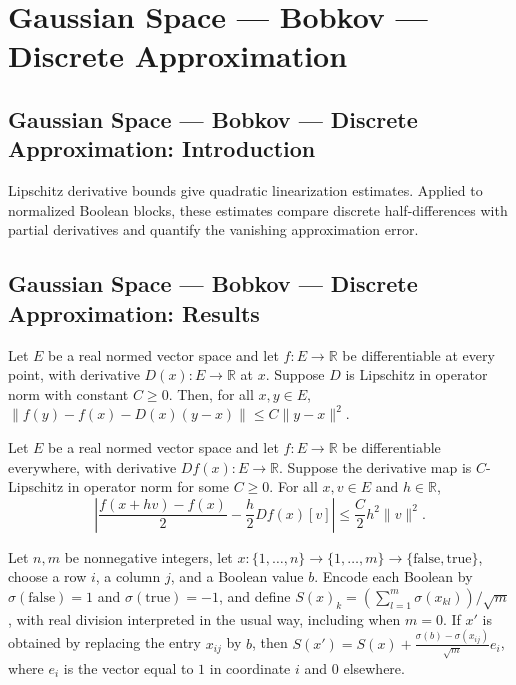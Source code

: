 \section{Gaussian Space --- Bobkov --- Discrete Approximation}
\subsection*{Gaussian Space --- Bobkov --- Discrete Approximation: Introduction}
Lipschitz derivative bounds give quadratic linearization estimates. Applied to normalized Boolean blocks, these estimates compare discrete half-differences with partial derivatives and quantify the vanishing approximation error.

\subsection*{Gaussian Space --- Bobkov --- Discrete Approximation: Results}

\begin{lemma}
\leanok
{}
Let $E$ be a real normed vector space and let $f\colon E\to\mathbb R$ be differentiable
at every point, with derivative $D(x)\colon E\to\mathbb R$ at $x$. Suppose $D$ is
Lipschitz in operator norm with constant $C\geq0$. Then, for all $x,y\in E$,
$\|f(y)-f(x)-D(x)(y-x)\|\leq C\|y-x\|^2$.
\end{lemma}

\begin{lemma}
\leanok
{}
Let $E$ be a real normed vector space and let $f:E\to\mathbb R$ be differentiable
everywhere, with derivative $Df(x):E\to\mathbb R$. Suppose the derivative map is
$C$-Lipschitz in operator norm for some $C\ge0$. For all $x,v\in E$ and $h\in\mathbb R$,
\[\left|\frac{f(x+hv)-f(x)}{2}-\frac{h}{2}Df(x)[v]\right|\le \frac{C}{2}h^2\|v\|^2.\]
\end{lemma}

\begin{lemma}
\leanok
{}
Let $n,m$ be nonnegative integers, let
$x\colon\{1,\ldots,n\}\to\{1,\ldots,m\}\to\{\mathrm{false},\mathrm{true}\}$, choose a
row $i$, a column $j$, and a Boolean value $b$. Encode each Boolean by
$\sigma(\mathrm{false})=1$ and $\sigma(\mathrm{true})=-1$, and define
$S(x)_k=(\sum_{l=1}^m\sigma(x_{kl}))/\sqrt m$, with real division interpreted in the
usual way, including when $m=0$. If $x'$ is obtained by replacing the entry $x_{ij}$ by
$b$, then $S(x')=S(x)+\frac{\sigma(b)-\sigma(x_{ij})}{\sqrt m}e_i$, where $e_i$ is the
vector equal to $1$ in coordinate $i$ and $0$ elsewhere.
\end{lemma}

